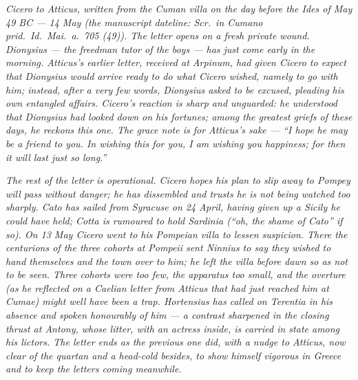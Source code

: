 
\textit{Cicero to Atticus, written from the Cuman villa
on the day before the Ides of May 49 BC --- 14 May
(the manuscript dateline: \textit{Scr.\ in Cumano prid.\
Id.\ Mai.\ a.\ 705 (49)}). The letter opens on a fresh
private wound. Dionysius --- the freedman tutor of the
boys --- has just come early in the morning. Atticus's
earlier letter, received at Arpinum, had given Cicero
to expect that Dionysius would arrive ready to do what
Cicero wished, namely to go with him; instead, after a
very few words, Dionysius asked to be excused, pleading
his own entangled affairs. Cicero's reaction is sharp
and unguarded: he understood that Dionysius had looked
down on his fortunes; among the greatest griefs of these
days, he reckons this one. The grace note is for
Atticus's sake --- ``I hope he may be a friend to you.
In wishing this for you, I am wishing you happiness;
for then it will last just so long.''}

\textit{The rest of the letter is operational. Cicero
hopes his plan to slip away to Pompey will pass without
danger; he has dissembled and trusts he is not being
watched too sharply. Cato has sailed from Syracuse on
24 April, having given up a Sicily he could have held;
Cotta is rumoured to hold Sardinia (``oh, the shame of
Cato'' if so). On 13 May Cicero went to his Pompeian
villa to lessen suspicion. There the centurions of the
three cohorts at Pompeii sent Ninnius to say they wished
to hand themselves and the town over to him; he left
the villa before dawn so as not to be seen. Three
cohorts were too few, the apparatus too small, and the
overture (as he reflected on a Caelian letter from
Atticus that had just reached him at Cumae) might well
have been a trap. Hortensius has called on Terentia in
his absence and spoken honourably of him --- a contrast
sharpened in the closing thrust at Antony, whose litter,
with an actress inside, is carried in state among his
lictors. The letter ends as the previous one did, with a
nudge to Atticus, now clear of the quartan and a
head-cold besides, to show himself vigorous in Greece
and to keep the letters coming meanwhile.}
